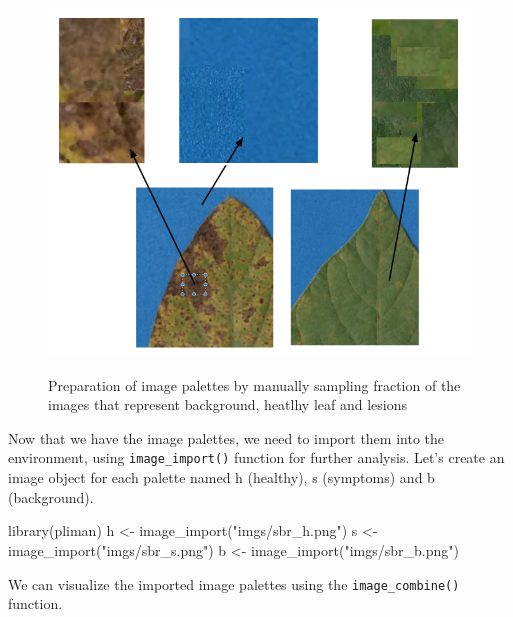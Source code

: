 \documentclass[
  letterpaper,
  DIV=11,
  numbers=noendperiod]{scrreprt}
\newenvironment{Shaded}{\begin{snugshade}}{\end{snugshade}}
\newcommand{\FunctionTok}[1]{\textcolor[rgb]{0.28,0.35,0.67}{#1}}
\newcommand{\NormalTok}[1]{\textcolor[rgb]{0.00,0.23,0.31}{#1}}
\newcommand{\OtherTok}[1]{\textcolor[rgb]{0.00,0.23,0.31}{#1}}
\newcommand{\StringTok}[1]{\textcolor[rgb]{0.13,0.47,0.30}{#1}}
\begin{document}
\begin{figure}

{\centering 

\href{Fig_palettes}{\includegraphics{imgs/pliman1.png}}

}

\caption{\label{fig-pliman1}Preparation of image palettes by manually
sampling fraction of the images that represent background, heatlhy leaf
and lesions}

\end{figure}

Now that we have the image palettes, we need to import them into the
environment, using \texttt{image\_import()} function for further
analysis. Let's create an image object for each palette named h
(healthy), s (symptoms) and b (background).

\begin{Shaded}
\begin{Highlighting}[]
\FunctionTok{library}\NormalTok{(pliman)}
\NormalTok{h }\OtherTok{\textless{}{-}} \FunctionTok{image\_import}\NormalTok{(}\StringTok{"imgs/sbr\_h.png"}\NormalTok{)}
\NormalTok{s }\OtherTok{\textless{}{-}} \FunctionTok{image\_import}\NormalTok{(}\StringTok{"imgs/sbr\_s.png"}\NormalTok{)}
\NormalTok{b }\OtherTok{\textless{}{-}} \FunctionTok{image\_import}\NormalTok{(}\StringTok{"imgs/sbr\_b.png"}\NormalTok{)}
\end{Highlighting}
\end{Shaded}

We can visualize the imported image palettes using the
\texttt{image\_combine()} function.
\end{document}
